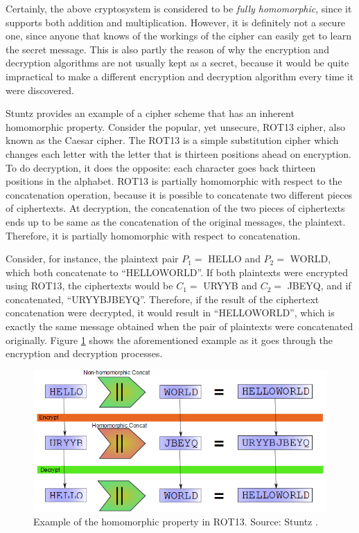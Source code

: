 Certainly, the above cryptosystem is considered to be \emph{fully homomorphic}, since it supports both addition and multiplication. However, it is definitely not a secure one, since anyone that knows of the workings of the cipher can easily get to learn the secret message. This is also partly the reason of why the encryption and decryption algorithms are not usually kept as a secret, because it would be quite impractical to make a different encryption and decryption algorithm every time it were discovered. 

Stuntz \cite{stuntz2010} provides an example of a cipher scheme that has an inherent homomorphic property. Consider the popular, yet unsecure, ROT13 cipher, also known as the Caesar cipher. The ROT13 is a simple substitution cipher which changes each letter with the letter that is thirteen positions ahead on encryption. To do decryption, it does the opposite: each character goes back thirteen positions in the alphabet. 
ROT13 is partially homomorphic with respect to the concatenation operation, because it is possible to concatenate two different pieces of ciphertexts. At decryption, the concatenation of the two pieces of ciphertexts ends up to be same as the concatenation of the original messages, the plaintext. Therefore, it is partially homomorphic with respect to concatenation. 

Consider, for instance, the plaintext pair $P_{1}=$ HELLO and $P_{2}=$ WORLD, which both concatenate to ``HELLOWORLD''. If both plaintexts were encrypted using ROT13, the ciphertexts would be $C_{1}=$ URYYB and $C_{2}=$ JBEYQ, and if concatenated, ``URYYBJBEYQ''. Therefore, if the result of the ciphertext concatenation were decrypted, it would result in ``HELLOWORLD'', which is exactly the same message obtained when the pair of plaintexts were concatenated originally. Figure \ref{fig:homosample} shows the aforementioned example as it goes through the encryption and decryption processes. 

\begin{figure}[H]
  \centerline{\includegraphics[scale=0.5]{img/rot13homo}}
  \caption[Example of the homomorphic property in ROT13]{Example of the homomorphic property in ROT13. Source: Stuntz \cite{stuntz2010}.}
  \label{fig:homosample}
\end{figure}

